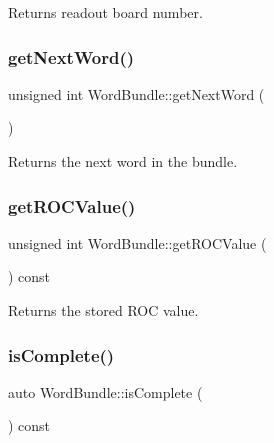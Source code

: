 Returns readout board number. 

\mbox{\label{class_word_bundle_a950e328fdf8b00e59b2d68da5182763f}} 
\subsubsection{\texorpdfstring{get\+Next\+Word()}{getNextWord()}}
{\footnotesize\ttfamily unsigned int Word\+Bundle\+::get\+Next\+Word (\begin{DoxyParamCaption}{ }\end{DoxyParamCaption})\hspace{0.3cm}{\ttfamily [inline]}}



Returns the next word in the bundle. 

\mbox{\label{class_word_bundle_ad2c91f230ac93d19900eba6b2c64d0e9}} 
\subsubsection{\texorpdfstring{get\+R\+O\+C\+Value()}{getROCValue()}}
{\footnotesize\ttfamily unsigned int Word\+Bundle\+::get\+R\+O\+C\+Value (\begin{DoxyParamCaption}{ }\end{DoxyParamCaption}) const\hspace{0.3cm}{\ttfamily [inline]}}



Returns the stored R\+OC value. 

\mbox{\label{class_word_bundle_a3afd16d04f92eec06e08a6ec59028ae9}} 
\subsubsection{\texorpdfstring{is\+Complete()}{isComplete()}}
{\footnotesize\ttfamily auto Word\+Bundle\+::is\+Complete (\begin{DoxyParamCaption}{ }\end{DoxyParamCaption}) const\hspace{0.3cm}{\ttfamily [inline]}}



